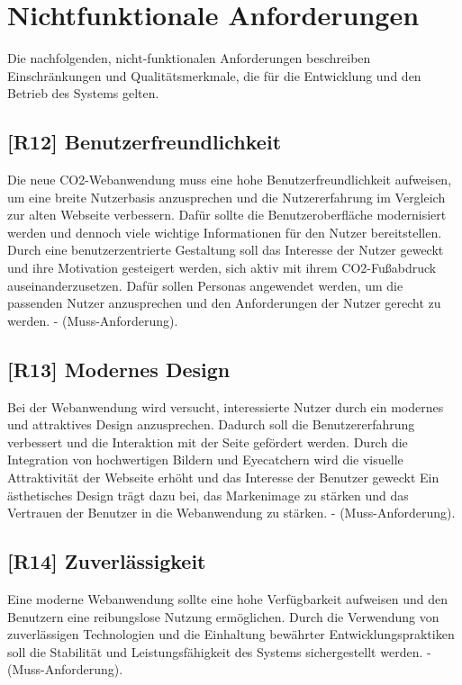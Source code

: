\section{Nichtfunktionale Anforderungen}
\label{chapter:3-section:nichtfunktionale-anforderungen}

Die nachfolgenden, nicht-funktionalen Anforderungen beschreiben Einschränkungen und Qualitätsmerkmale, die für die Entwicklung und den Betrieb des Systems gelten.

\subsection{[R12] Benutzerfreundlichkeit}

Die neue CO2-Webanwendung muss eine hohe Benutzerfreundlichkeit aufweisen, um eine breite Nutzerbasis anzusprechen und die Nutzererfahrung im Vergleich zur alten Webseite verbessern.
Dafür sollte die Benutzeroberfläche modernisiert werden und dennoch viele wichtige Informationen für den Nutzer bereitstellen.
Durch eine benutzerzentrierte Gestaltung soll das Interesse der Nutzer geweckt und ihre Motivation gesteigert werden, sich aktiv mit ihrem CO2-Fußabdruck auseinanderzusetzen.
Dafür sollen Personas angewendet werden, um die passenden Nutzer anzusprechen und den Anforderungen der Nutzer gerecht zu werden.
- (Muss-Anforderung).

\subsection{[R13] Modernes Design}

Bei der Webanwendung wird versucht, interessierte Nutzer durch ein modernes und attraktives Design anzusprechen.
Dadurch soll die Benutzererfahrung verbessert und die Interaktion mit der Seite gefördert werden.
Durch die Integration von hochwertigen Bildern und Eyecatchern wird die visuelle Attraktivität der Webseite erhöht und das Interesse der Benutzer geweckt Ein ästhetisches Design trägt dazu bei, das Markenimage zu stärken und das Vertrauen der Benutzer in die Webanwendung zu stärken.
- (Muss-Anforderung).

\subsection{[R14] Zuverlässigkeit}

Eine moderne Webanwendung sollte eine hohe Verfügbarkeit aufweisen und den Benutzern eine reibungslose Nutzung ermöglichen.
Durch die Verwendung von zuverlässigen Technologien und die Einhaltung bewährter Entwicklungspraktiken soll die Stabilität und Leistungsfähigkeit des Systems sichergestellt werden.
- (Muss-Anforderung).

